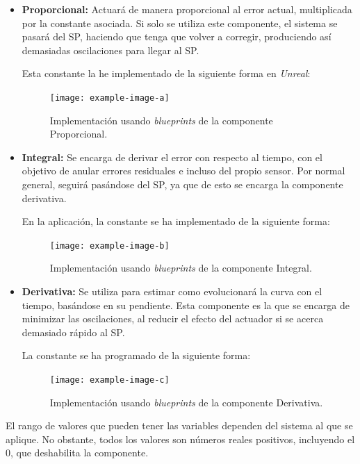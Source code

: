 \begin{itemize}
    \item \textbf{Proporcional: }Actuará de manera proporcional al error actual, multiplicada por la constante asociada. Si solo se utiliza este componente, el sistema se pasará del SP, haciendo que tenga que volver a corregir, produciendo así demasiadas oscilaciones para llegar al SP. 
    
    Esta constante la he implementado de la siguiente forma en \textit{Unreal}:

\begin{figure}[H]
    \centering
    \texttt{[image: example-image-a]}
    \caption{Implementación usando \textit{blueprints} de la componente Proporcional.}
\end{figure}

    \item \textbf{Integral: }Se encarga de derivar el error con respecto al tiempo, con el objetivo de anular errores residuales e incluso del propio sensor. Por normal general, seguirá pasándose del SP, ya que de esto se encarga la componente derivativa.
    
    En la aplicación, la constante se ha implementado de la siguiente forma: 

    \begin{figure}[H]
        \centering
        \texttt{[image: example-image-b]}
        \caption{Implementación usando \textit{blueprints} de la componente Integral.}
    \end{figure}

    \item \textbf{Derivativa: }Se utiliza para estimar como evolucionará la curva con el tiempo, basándose en su pendiente. Esta componente es la que se encarga de minimizar las oscilaciones, al reducir el efecto del actuador si se acerca demasiado rápido al SP.
    
    La constante se ha programado de la siguiente forma:

    \begin{figure}[H]
        \centering
        \texttt{[image: example-image-c]}
        \caption{Implementación usando \textit{blueprints} de la componente Derivativa.}
    \end{figure}    
\end{itemize}

\bigskip

El rango de valores que pueden tener las variables dependen del sistema al que se aplique. No obstante, todos los valores son números reales positivos, incluyendo el 0, que deshabilita la componente.

